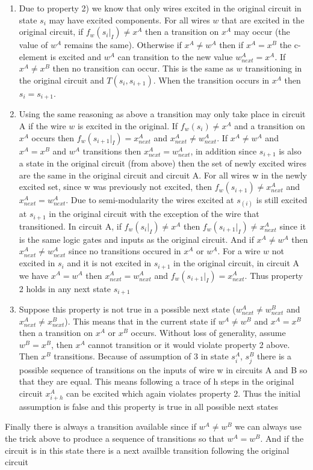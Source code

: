 \documentclass{article}
\begin{document}
\begin{enumerate} %
\item  Due to property 2) we know that only wires excited in the original circuit in state $s_i$ may have excited components.  For all wires $w$ that are excited in the original circuit, if $f_w(s_i|_I)\neq x^A$ then a transition on $x^A$ may occur (the value of $w^A$ remains the same).  Otherwise if $x^A \neq w^A$ then if $x^A = x^B$ the c-element is excited and $w^A$ can transition to the new value $w_{next}^A=x^A$.  If $x^A \neq x^B$ then no transition can occur. This is the same as $w$ transitioning in the original circuit and $T(s_i, s_{i+1})$.  When the transition occurs in $x^A$ then $s_i=s_{i+1}$. 
\item  Using the same reasoning as above a transition may only take place in circuit A if the wire $w$ is excited in the original.   If $f_w(s_i)\neq x^A$ and a transition on $x^A$ occurs then $f_w(s_{i+1}|_I)= x_{next}^A$ and $x_{next}^A\neq w_{next}^A$.  
If $x^A \neq w^A$ and $x^A = x^B$ and $w^A$ transitions then  $x_{next}^A= w_{next}^A$, in addition since $s_{i+1}$ is also a state in the original circuit (from above) then the set of newly excited wires are the same in the original circuit and circuit A.  
For all wires w in the newly excited set, since w was previously not excited, then $f_w(s_{i+1})\neq x_{next}^A$ and $x_{next}^A= w_{next}^A$.  Due to semi-modularity the wires excited at $s_(i)$ is still excited at $s_{i+1}$ in the original circuit with the exception of the wire that transitioned.  In circuit A, if $f_w(s_i|_I)\neq x^A$ then $f_w(s_{i+1}|_I)\neq x_{next}^A$ since it is the same logic gates and inputs as the original circuit.  And if $x^A \neq w^A$ then $x_{next}^A \neq w_{next}^A$ since no transitions occured in $x^A$ or $w^A$. %
For a wire $w$ not excited in $s_i$ and it is not excited in $s_{i+1}$ in the original circuit, in circuit A we have $x^A=w^A$ then $x_{next}^A=w_{next}^A$ and $f_w(s_{i+1}|_I)= x_{next}^A$.  Thus property 2 holds in any next state $s_{i+1}$
\item  Suppose this property is not true in a possible next state ($w_{next}^A\neq w_{next}^B$ and $x_{next}^A\neq x_{next}^B$).  This means that in the current state if $w^A \neq w^B$ and $x^A=x^B$ then a transition on $x^A$ or $x^B$ occurs.  Without loss of generality, assume $w^B=x^B$, then $x^A$ cannot transition or it would violate property 2 above.  Then $x^B$ transitions.  Because of assumption of 3 in state $s_i^A$, $s_j^B$ there is a possible sequence of transitions on the inputs of wire w in circuits A and B so that they are equal.  This means following a trace of h steps in the original circuit  $x_{i+h}^A$ can be excited which again violates property 2.  Thus the initial assumption is false and this property is true in all possible next states 
\end{enumerate}
Finally there is always a transition available since if $w^A\neq w^B$ we can always use the trick above to produce a sequence of transitions so that $w^A= w^B$.  And if the circuit is in this state there is a next availble transition following the original circuit
\end{document}
